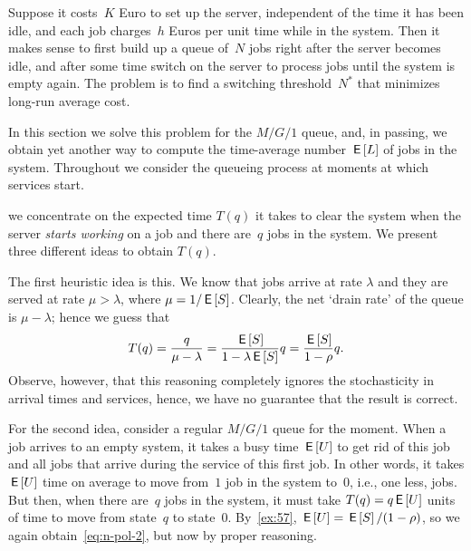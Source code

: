 \documentclass[stochastic-or.tex]{subfiles}
\begin{document}
Suppose it costs~$K$ Euro to set up the server, independent of the time it has been idle, and each job charges~$h$ Euros per unit time while in the system.
Then it makes sense to first build up a queue of~$N$ jobs right after the server becomes idle,
and after some time switch on the server to process jobs until the system is empty again.
The problem is to find a switching threshold~$N^{*}$ that minimizes long-run average cost.


In this section we solve this problem for the $M/G/1$ queue, and, in passing, we obtain yet another way to compute the time-average number $\,\mathsf{E}\left[L\right]$ of jobs in the system.
Throughout we consider the queueing process at moments at which services start.


 we concentrate on the expected time $T(q)$ it takes to clear the system when the server \emph{starts working} on a job and there are~$q$ jobs in the system. We present three different ideas to obtain $T(q)$.

The first heuristic idea is this. We know that jobs arrive at rate $\lambda$ and they are served at rate $\mu>\lambda$, where $\mu = 1/ \,\mathsf{E}\left[S\right]$.
Clearly, the net `drain rate' of the queue is $\mu-\lambda$; hence we guess that
\begin{equation}\label{eq:n-pol-2}
T(q)= \frac{q}{\mu-\lambda} = \frac{\,\mathsf{E}\left[S\right] }{1-\lambda \,\mathsf{E}\left[S\right]} q = \frac{\,\mathsf{E}\left[S\right]}{1-\rho}q.
\end{equation}
Observe, however, that this reasoning completely ignores the stochasticity in arrival times and services, hence, we have no guarantee that the result is correct.


For the second idea, consider a regular $M/G/1$ queue for the moment.
When a job arrives to an empty system, it takes a busy time $\,\mathsf{E}\left[U\right]$ to get rid of this job and all jobs that arrive during the service of this first job.
In other words, it takes $\,\mathsf{E}\left[U\right]$ time on average to move from~$1$ job in the system to~$0$, i.e., one less, jobs.
But then, when there are~$q$ jobs in the system, it must take $T(q) = q\,\mathsf{E}\left[U\right]$ units of time to move from state~$q$ to state~$0$.
By~\cref{ex:57}, $\,\mathsf{E}\left[U\right]=\,\mathsf{E}\left[S\right]/(1-\rho)$, so we again obtain~\cref{eq:n-pol-2}, but now by proper reasoning.
\end{document}
